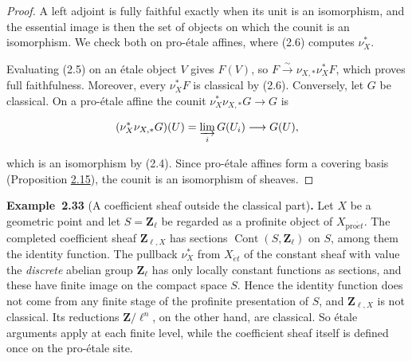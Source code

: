\documentclass[11pt]{article}
\newenvironment{bpstatement}[2]{\par\addvspace{0.6\baselineskip}\noindent\textbf{#1}#2\textbf{.}\enspace\ignorespaces}
  {\par\addvspace{0.4\baselineskip}}
\begin{document}
\begin{proof}[{Proof}]\label{bp94}%
A left adjoint is fully faithful exactly when its unit is an isomorphism, and the essential image is then the set of objects on which the counit is an isomorphism. We check both on pro-étale affines, where (2.6) computes \(\nu_X^*\).

Evaluating (2.5) on an étale object \(V\) gives \(F(V)\), so \(F\xrightarrow{\sim}\nu_{X,*}\nu_X^*F\), which proves full faithfulness. Moreover, every \(\nu_X^*F\) is classical by (2.6). Conversely, let \(G\) be classical. On a pro-étale affine the counit \(\nu_X^*\nu_{X,*}G\to G\) is

\[
(\nu_X^*\nu_{X,*}G)(U)
=\varinjlim_iG(U_i)\longrightarrow G(U),
\]

which is an isomorphism by (2.4). Since pro-étale affines form a covering basis (Proposition \hyperref[bp44]{2.15}), the counit is an isomorphism of sheaves.
\end{proof}

\label{bp95}%
\begin{bpstatement}{Example~2.33}{ (A coefficient sheaf outside the classical part)}
Let \(X\) be a geometric point and let \(S=\mathbf Z_\ell\) be regarded as a profinite object of \(X_{\mathrm{pro}\acute{e}t}\). The completed coefficient sheaf \(\mathbf Z_{\ell,X}\) has sections \(\operatorname{Cont}(S,\mathbf Z_\ell)\) on \(S\), among them the identity function. The pullback \(\nu_X^*\) from \(X_{\acute{e}t}\) of the constant sheaf with value the \emph{discrete} abelian group \(\mathbf Z_\ell\) has only locally constant functions as sections, and these have finite image on the compact space \(S\). Hence the identity function does not come from any finite stage of the profinite presentation of \(S\), and \(\mathbf Z_{\ell,X}\) is not classical. Its reductions \(\mathbf Z/\ell^n\), on the other hand, are classical. So étale arguments apply at each finite level, while the coefficient sheaf itself is defined once on the pro-étale site.
\end{bpstatement}


\end{document}

